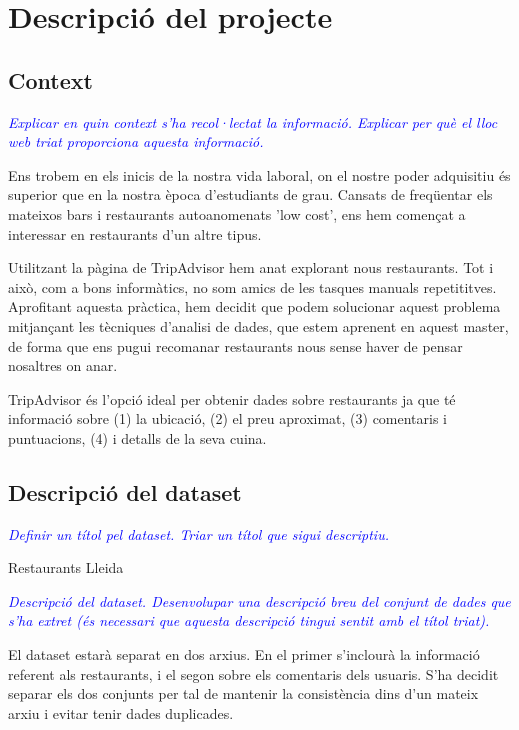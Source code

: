 \documentclass{article}
\title{\large \subject \\ \activity}
\author{Josep Alòs Pascual, Daniel Galan Vilella}
\date{\today}
\newcommand\enunciat[2][blue]{\textcolor{#1}{\emph{#2}}}
\begin{document}
\maketitle

\section{Descripció del projecte}
\subsection{Context}
\enunciat{Explicar en quin context s'ha recol·lectat la informació. Explicar per
què el lloc web triat proporciona aquesta informació.}

Ens trobem en els inicis de la nostra vida laboral, on el nostre poder adquisitiu és superior que en la nostra època d'estudiants de grau. Cansats de freqüentar els mateixos bars i restaurants autoanomenats 'low cost', ens hem començat a interessar en restaurants d'un altre tipus. 

Utilitzant la pàgina de TripAdvisor hem anat explorant nous restaurants. Tot i això, com a bons informàtics, no som amics de les tasques manuals repetititves. 
Aprofitant aquesta pràctica, hem decidit que podem solucionar aquest problema mitjançant les tècniques d'analisi de dades, que estem aprenent en aquest master, de forma que ens pugui recomanar restaurants nous sense haver de pensar nosaltres on anar.

TripAdvisor és l'opció ideal per obtenir dades sobre restaurants ja que té informació sobre (1) la ubicació, (2) el preu aproximat, (3) comentaris i puntuacions, (4) i detalls de la seva cuina.


\subsection{Descripció del dataset}
\enunciat{Definir un títol pel dataset. Triar un títol que sigui descriptiu.}

Restaurants Lleida

\enunciat{Descripció del dataset. Desenvolupar una descripció breu del conjunt
de dades que s'ha extret (és necessari que aquesta descripció tingui sentit amb
el títol triat).}

El dataset estarà separat en dos arxius. En el primer s'inclourà la informació
referent als restaurants, i el segon sobre els comentaris dels usuaris. S'ha
decidit separar els dos conjunts per tal de mantenir la consistència dins d'un
mateix arxiu i evitar tenir dades duplicades.
\end{document}
